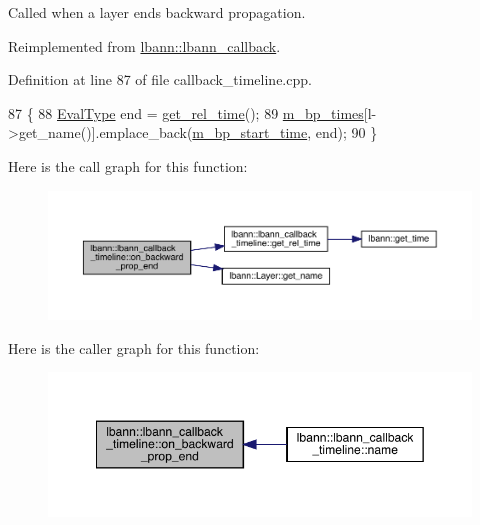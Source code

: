 Called when a layer ends backward propagation. 

Reimplemented from \hyperlink{classlbann_1_1lbann__callback_aba03b59c056ace8094095c08e39b9ac4}{lbann\+::lbann\+\_\+callback}.



Definition at line 87 of file callback\+\_\+timeline.\+cpp.


\begin{DoxyCode}
87                                                                      \{
88   \hyperlink{base_8hpp_a3266f5ac18504bbadea983c109566867}{EvalType} end = \hyperlink{classlbann_1_1lbann__callback__timeline_a67da1376356bf2153ab67489014e0ad4}{get\_rel\_time}();
89   \hyperlink{classlbann_1_1lbann__callback__timeline_a59e63a11f33ed0cf3fd40dd2d8f91ede}{m\_bp\_times}[l->get\_name()].emplace\_back(\hyperlink{classlbann_1_1lbann__callback__timeline_a7c4383231990d3a5fc8ec22a93784e15}{m\_bp\_start\_time}, end);
90 \}
\end{DoxyCode}
Here is the call graph for this function\+:\nopagebreak
\begin{figure}[H]
\begin{center}
\leavevmode
\includegraphics[width=350pt]{classlbann_1_1lbann__callback__timeline_a0de42325a96128f7e41ecf8004b99b26_cgraph}
\end{center}
\end{figure}
Here is the caller graph for this function\+:\nopagebreak
\begin{figure}[H]
\begin{center}
\leavevmode
\includegraphics[width=349pt]{classlbann_1_1lbann__callback__timeline_a0de42325a96128f7e41ecf8004b99b26_icgraph}
\end{center}
\end{figure}
\mbox{\label{classlbann_1_1lbann__callback__timeline_a9c093b091fd38b79f8632cf786d29ce2}} 

